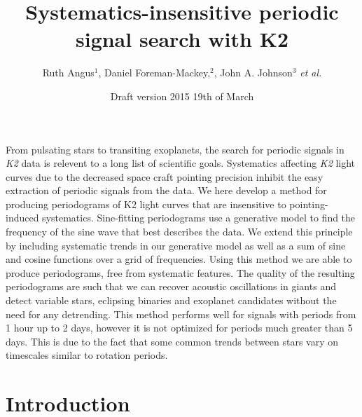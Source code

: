 \documentclass[useAMS, usenatbib]{aastex}
\title{Systematics-insensitive periodic signal search with K2}
\begin{document}

\author{Ruth Angus$^1$, Daniel Foreman-Mackey,$^2$, John A. Johnson$^3$ {\it et
al.}}

\date{Draft version 2015 19th of March}
\maketitle

From pulsating stars to transiting exoplanets, the search for periodic signals
in {\it K2} data is relevent to a long list of scientific goals.
Systematics affecting {\it K2} light curves due to the decreased
space craft pointing precision inhibit the easy extraction of periodic signals
from the data.
We here develop a method for producing periodograms of K2 light curves that
are insensitive to pointing-induced systematics.
Sine-fitting periodograms use a generative model to find the frequency
of the sine wave that best describes the data.
We extend this principle by including systematic trends in our generative
model as well as a sum of sine and cosine functions over a grid of
frequencies.
Using this method we are able to produce periodograms, free from
systematic features.
The quality of the resulting periodograms are such that we can recover
acoustic oscillations in giants and detect variable stars, eclipsing binaries
and exoplanet candidates without the need for any detrending.
This method performs well for signals with periods from 1 hour up to 2 days,
however it is not optimized for periods much greater than 5 days.
This is due to the fact that some common trends between stars vary on
timescales similar to rotation periods.

\section{Introduction}
\label{Introduction}
\end{document}
